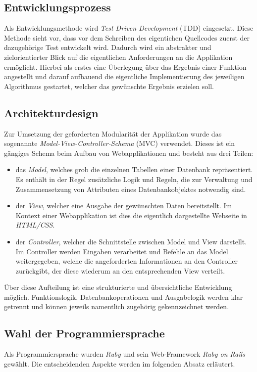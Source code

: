 \subsection{Entwicklungsprozess}
\label{sec:Entwicklungsprozess}
Als Entwicklungsmethode wird \textit{Test Driven Development} (\acs{TDD}) eingesetzt. Diese Methode
sieht vor, dass vor dem Schreiben des eigentichen Quellcodes zuerst der
dazugehörige Test entwickelt wird. Dadurch wird ein abstrakter und
zielorientierter Blick auf die eigentlichen Anforderungen an die Applikation ermöglicht.
Hierbei als erstes eine Überlegung über das Ergebnis einer Funktion angestellt und darauf
aufbauend die eigentliche Implementierung des jeweiligen Algorithmus gestartet, welcher das gewünschte
Ergebnis erzielen soll.

\subsection{Architekturdesign}
\label{sec:Architekturdesign}
Zur Umsetzung der geforderten Modularität der Applikation wurde das sogenannte
\textit{Model-View-Controller-Schema} (\acs{MVC}) verwendet. Dieses ist ein gängiges Schema beim Aufbau von
Webapplikationen und besteht aus drei Teilen:
\begin{itemize}
	\item das \textit{Model}, welches grob die einzelnen Tabellen einer Datenbank repräsentiert. Es enthält in
	der Regel zusätzliche Logik und Regeln, die zur Verwaltung und Zusammensetzung von Attributen
	eines Datenbankobjektes notwendig sind.
	\item der \textit{View}, welcher eine Ausgabe der gewünschten Daten bereitstellt. Im Kontext einer
	Webapplikation ist dies die eigentlich dargestellte Webseite in \textit{HTML/CSS}.
	\item der \textit{Controller}, welcher die Schnittstelle zwischen Model und View darstellt.
	Im Controller werden Eingaben verarbeitet und Befehle an das Model weitergegeben, welche
	die angeforderten Informationen an den Controller zurückgibt, der diese wiederum an den
	entsprechenden View verteilt.
\end{itemize}
Über diese Aufteilung ist eine strukturierte und übersichtliche Entwicklung möglich. Funktionslogik,
Datenbankoperationen und Ausgabelogik werden klar getrennt und können jeweils namentlich zugehörig
gekennzeichnet werden.


\subsection{Wahl der Programmiersprache}
\label{sec:Wahl der Programmiersprache}
Als Programmiersprache wurden \textit{Ruby} und sein Web-Framework \textit{Ruby on Rails} gewählt.
Die entscheidenden Aspekte werden im folgenden Absatz erläutert.

